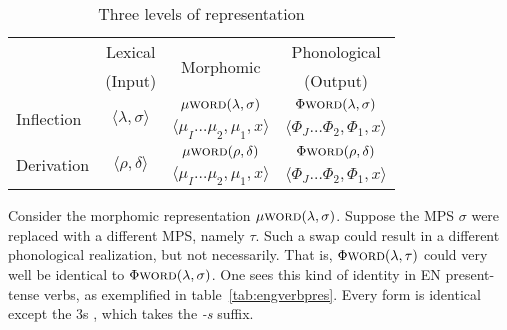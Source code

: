\begin{table}[ht]
\centering
\begin{tabular}{l c c c}
\hline\hline
    & Lexical & \multirow{2}{*}{Morphomic}  & Phonological  \\
    & (Input)	 &        	&  (Output) \\
\hline
\multirow{2}{*}{Inflection} & \multirow{2}{*}{$\langle \lambda,\sigma \rangle$} & $\mu{\textsc{word}}(\lambda,\sigma)$ & $\Phi{\textsc{word}}(\lambda,\sigma)$\\     
    				&  &  $\langle  \mu_{I} \dots \mu_{2}, \mu_{1}, x \rangle$ & 
				$\langle  \Phi_{J} \dots \Phi_{2}, \Phi_{1}, x \rangle$ \\ \hline 
\multirow{2}{*}{Derivation} & \multirow{2}{*}{$\langle \rho,\delta \rangle$} & 
$\mu{\textsc{word}}(\rho,\delta)$ & 
$\Phi{\textsc{word}}(\rho,\delta)$ \\
    				& & $\langle \mu_{I} \dots \mu_{2}, \mu_{1}, x \rangle$ & $\langle \Phi_{J} \dots \Phi_{2}, \Phi_{1}, x \rangle$ \\[0.5ex]
\hline 
\end{tabular}
\label{tab:morphreps}
\caption{Three levels of representation}
\end{table}
Consider the morphomic representation $\mu{\textsc{word}}(\lambda,\sigma)$.
Suppose the \ac{MPS} $\sigma$ were replaced with a different \ac{MPS}, namely $\tau$. 
Such a swap could result in a different phonological realization, but not necessarily. 
That is, $\Phi{\textsc{word}}(\lambda,\tau)$ could very well be identical to 
 $\Phi{\textsc{word}}(\lambda,\sigma)$. One sees this kind of identity in \ac{EN}
 present-tense verbs, as exemplified in table~\ref{tab:engverbpres}. Every form is identical except the 3s , which takes the \textit{-s} suffix.%

